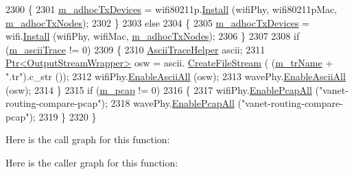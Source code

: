 \begin{DoxyCode}
2300     \{
2301       \hyperlink{classVanetRoutingExperiment_a613934ac9ec78c32456236ea6f09aa43}{m\_adhocTxDevices} = wifi80211p.\hyperlink{classns3_1_1Wifi80211pHelper_a7c72c82947837e274fb09c36dec75d21}{Install} (wifiPhy, wifi80211pMac, 
      \hyperlink{classVanetRoutingExperiment_aaea34adc85cd667ea5d3371c3fa1e3dc}{m\_adhocTxNodes});
2302     \}
2303   \textcolor{keywordflow}{else}
2304     \{
2305       \hyperlink{classVanetRoutingExperiment_a613934ac9ec78c32456236ea6f09aa43}{m\_adhocTxDevices} = wifi.\hyperlink{classns3_1_1WifiHelper_a451b3d33fa1497c22f06c5451f57a127}{Install} (wifiPhy, wifiMac, 
      \hyperlink{classVanetRoutingExperiment_aaea34adc85cd667ea5d3371c3fa1e3dc}{m\_adhocTxNodes});
2306     \}
2307 
2308   \textcolor{keywordflow}{if} (\hyperlink{classVanetRoutingExperiment_a2de6513e66df96777e2a8fbd9b7c615a}{m\_asciiTrace} != 0)
2309     \{
2310       \hyperlink{classns3_1_1AsciiTraceHelper}{AsciiTraceHelper} ascii;
2311       \hyperlink{classns3_1_1Ptr}{Ptr<OutputStreamWrapper>} osw = ascii.
      \hyperlink{classns3_1_1AsciiTraceHelper_a44960bf2ca32835024eaedd26d1c4f94}{CreateFileStream} ( (\hyperlink{classVanetRoutingExperiment_a0466c1a95224670184e95070078f593a}{m\_trName} + \textcolor{stringliteral}{".tr"}).c\_str ());
2312       wifiPhy.\hyperlink{classns3_1_1AsciiTraceHelperForDevice_a63e57c878526c732924e14c1e52cca8b}{EnableAsciiAll} (osw);
2313       wavePhy.\hyperlink{classns3_1_1AsciiTraceHelperForDevice_a63e57c878526c732924e14c1e52cca8b}{EnableAsciiAll} (osw);
2314     \}
2315   \textcolor{keywordflow}{if} (\hyperlink{classVanetRoutingExperiment_ac7fb62cd5e00be235c70ac0848646ba4}{m\_pcap} != 0)
2316     \{
2317       wifiPhy.\hyperlink{classns3_1_1PcapHelperForDevice_a4ab183a2512120200d4a0e5d8ececd49}{EnablePcapAll} (\textcolor{stringliteral}{"vanet-routing-compare-pcap"});
2318       wavePhy.\hyperlink{classns3_1_1PcapHelperForDevice_a4ab183a2512120200d4a0e5d8ececd49}{EnablePcapAll} (\textcolor{stringliteral}{"vanet-routing-compare-pcap"});
2319     \}
2320 \}
\end{DoxyCode}


Here is the call graph for this function\+:




Here is the caller graph for this function\+:


